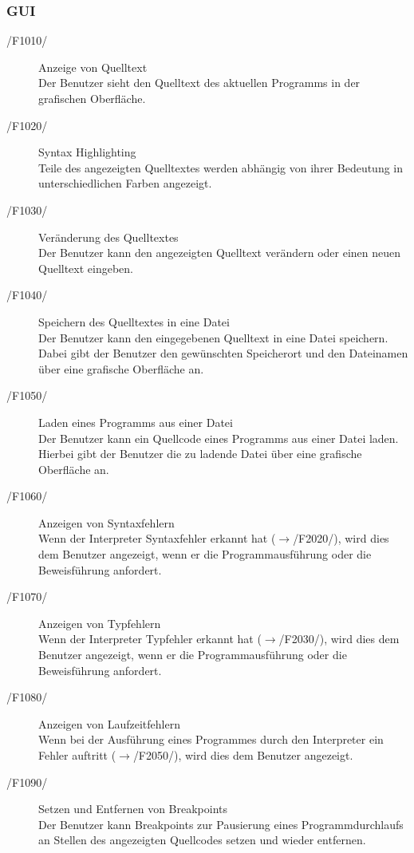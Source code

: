 \documentclass[a4paper,10pt]{article}
\begin{document}
\subsubsection{GUI}
\begin{description}
\item[/F1010/] Anzeige von Quelltext\\
Der Benutzer sieht den Quelltext des aktuellen Programms in der grafischen Oberfl\"{a}che.
\item[/F1020/] Syntax Highlighting\\
Teile des angezeigten Quelltextes werden abh\"{a}ngig von ihrer Bedeutung in unterschiedlichen Farben angezeigt.
\newpage
\item[/F1030/] Ver\"{a}nderung des Quelltextes\\
Der Benutzer kann den angezeigten Quelltext ver\"{a}ndern oder einen neuen Quelltext eingeben.
\item[/F1040/] Speichern des Quelltextes in eine Datei\\
Der Benutzer kann den eingegebenen Quelltext in eine Datei speichern. Dabei gibt der Benutzer den gew\"{u}nschten Speicherort und den Dateinamen \"{u}ber eine grafische Oberfl\"{a}che an.
\item[/F1050/] Laden eines Programms aus einer Datei\\
Der Benutzer kann ein Quellcode eines Programms aus einer Datei laden. Hierbei gibt der Benutzer die zu ladende Datei \"{u}ber eine grafische Oberfl\"{a}che an.
\item[/F1060/] Anzeigen von Syntaxfehlern\\
Wenn der Interpreter Syntaxfehler erkannt hat ($\to$/F2020/), wird dies dem Benutzer angezeigt, wenn er die Programmausf\"{u}hrung oder die Beweisf\"{u}hrung anfordert.
\item[/F1070/] Anzeigen von Typfehlern\\
Wenn der Interpreter Typfehler erkannt hat ($\to$/F2030/), wird dies dem Benutzer angezeigt, wenn er die Programmausf\"{u}hrung oder die Beweisf\"{u}hrung anfordert.
\item[/F1080/] Anzeigen von Laufzeitfehlern\\
Wenn bei der Ausf\"{u}hrung eines Programmes durch den Interpreter ein Fehler auftritt ($\to$/F2050/), wird dies dem Benutzer angezeigt.
\item[/F1090/] Setzen und Entfernen von Breakpoints\\
Der Benutzer kann Breakpoints zur Pausierung eines Programmdurchlaufs an Stellen des angezeigten Quellcodes setzen und wieder entfernen.

\end{description}
\end{document}
